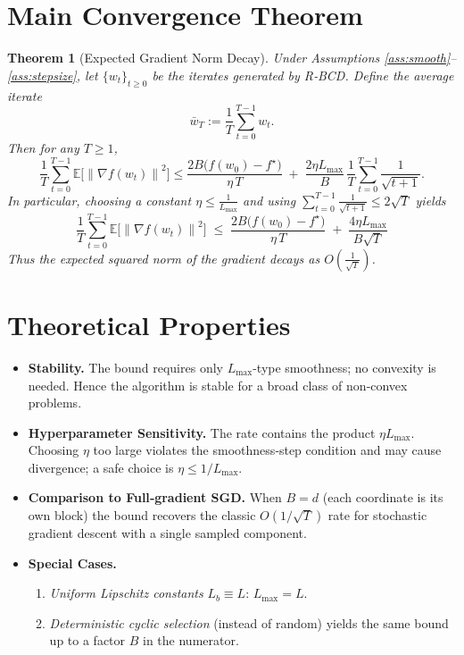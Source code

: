 \documentclass[11pt]{article}
\newtheorem{theorem}{Theorem}
\newcommand{\E}{\mathbb{E}}
\newcommand{\norm}[1]{\left\|#1\right\|}
\begin{document}
\section*{Main Convergence Theorem}
\begin{theorem}[Expected Gradient Norm Decay]\label{thm:main}
Under Assumptions \ref{ass:smooth}–\ref{ass:stepsize}, let $\{w_t\}_{t\ge0}$ be the iterates generated by R‑BCD. Define the average iterate
\[
\bar w_T:=\frac{1}{T}\sum_{t=0}^{T-1} w_t .
\]
Then for any $T\ge 1$,
\[
\frac{1}{T}\sum_{t=0}^{T-1}\E\!\big[\norm{\nabla f(w_t)}^{2}\big]
\le
\frac{2B\big(f(w_0)-f^{\star}\big)}{\eta\,T}
\;+\;
\frac{2\eta L_{\max}}{B}\,
\frac{1}{T}\sum_{t=0}^{T-1}\frac{1}{\sqrt{t+1}} .
\]
In particular, choosing a constant $\eta\le \frac{1}{L_{\max}}$ and using $\sum_{t=0}^{T-1}\frac{1}{\sqrt{t+1}}\le 2\sqrt{T}$ yields
\[
\boxed{\;
\frac{1}{T}\sum_{t=0}^{T-1}\E\!\big[\norm{\nabla f(w_t)}^{2}\big]
\;\le\;
\frac{2B\big(f(w_0)-f^{\star}\big)}{\eta\,T}
\;+\;
\frac{4\eta L_{\max}}{B\sqrt{T}}
\;}
\]
Thus the expected squared norm of the gradient decays as $O\!\left(\frac{1}{\sqrt{T}}\right)$.
\end{theorem}

\section*{Theoretical Properties}
\begin{itemize}
\item \textbf{Stability.} The bound requires only $L_{\max}$-type smoothness; no convexity is needed. Hence the algorithm is stable for a broad class of non‑convex problems.
\item \textbf{Hyperparameter Sensitivity.} The rate contains the product $\eta L_{\max}$. Choosing $\eta$ too large violates the smoothness‑step condition and may cause divergence; a safe choice is $\eta\le 1/L_{\max}$.
\item \textbf{Comparison to Full‑gradient SGD.} When $B=d$ (each coordinate is its own block) the bound recovers the classic $O(1/\sqrt{T})$ rate for stochastic gradient descent with a single sampled component.
\item \textbf{Special Cases.}
    \begin{enumerate}
        \item \emph{Uniform Lipschitz constants} $L_b\equiv L$: $L_{\max}=L$.
        \item \emph{Deterministic cyclic selection} (instead of random) yields the same bound up to a factor $B$ in the numerator.
    \end{enumerate}
\end{itemize}
\end{document}
